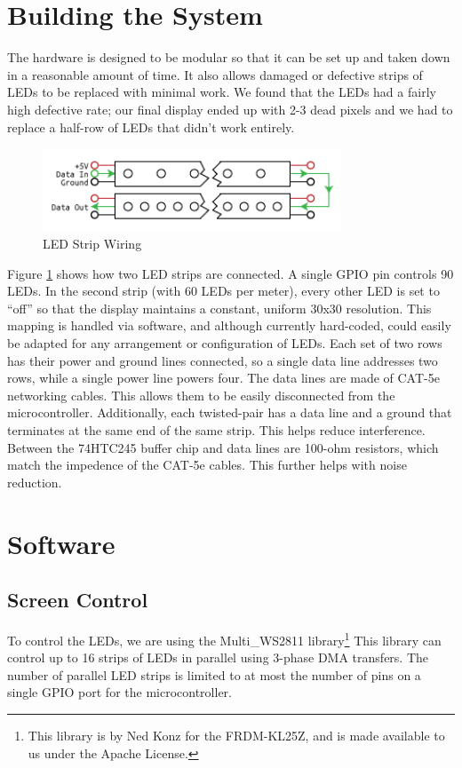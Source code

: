 \documentclass[10pt,twocolumn]{article}
\begin{document}
\section{\textbf{Building the System}}
The hardware is designed to be modular so that it can be set up and taken down
in a reasonable amount of time. It also allows damaged or defective strips of
LEDs to be replaced with minimal work. We found that the LEDs had a fairly
high defective rate; our final display ended up with 2-3 dead pixels and we
had to replace a half-row of LEDs that didn't work entirely.
\begin{figure}[H]
    \includegraphics[width=3.5in]{Wiring_Diagram.png}
    \caption{LED Strip Wiring}
    \label{wiring-diagram}
\end{figure}
Figure \ref{wiring-diagram} shows how two LED strips are connected. A single
GPIO pin controls 90 LEDs. In the second strip (with 60 LEDs per meter), every
other LED is set to ``off'' so that the display maintains a constant, uniform
30x30 resolution. This mapping is handled via software, and although currently
hard-coded, could easily be adapted for any arrangement or configuration of
LEDs. Each set of two rows has their power and ground lines connected, so a
single data line addresses two rows, while a single power line powers four.
The data lines are made of CAT-5e networking cables. This allows them to be
easily disconnected from the microcontroller. Additionally, each twisted-pair
has a data line and a ground that terminates at the same end of the same
strip. This helps reduce interference. Between the 74HTC245 buffer chip and
data lines are 100-ohm resistors, which match the impedence of the CAT-5e
cables. This further helps with noise reduction.
\section{\textbf{Software}}
\subsection{Screen Control}
To control the LEDs, we are using the Multi\_WS2811 library\footnote{This
library is by Ned Konz for the FRDM-KL25Z, and is made available to us under
the Apache License.} This library can control up to 16 strips of LEDs in
parallel using 3-phase DMA transfers. The number of parallel LED
strips is limited to at most the number of pins on a single GPIO port for the
microcontroller. 
\end{document}
